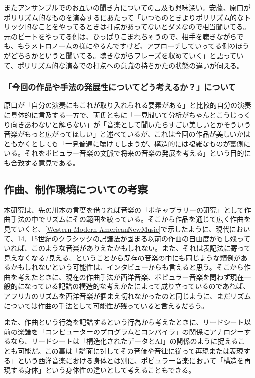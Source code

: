 \documentclass[uplatex,dvipdfmx]{ujarticle}
\begin{document}
またアンサンブルでのお互いの聞き方についての言及も興味深い。安藤、原口がポリリズム的なものを演奏するにあたって「いつものときよりポリリズム的なトリック的なことをやってるときは打点があってないとダメなので相当聞いてる。元のビートをやってる側は、ひっぱりこまれちゃうので、相手を聴きながらでも、もうメトロノームの様にやるんですけど、アプローチしていってる側のほうがどちらかというと聞いてる。聴きながらフレーズを収めていく」と語っていて、ポリリズム的な演奏での打点への意識の持ちかたの状態の違いが伺える。

\subsubsection{「今回の作品や手法の発展性についてどう考えるか？」について}

原口が「自分の演奏にもこれが取り入れられる要素がある」と比較的自分の演奏に具体的に言及する一方で、両氏ともに「一見聞いて分析がちゃんとこうじっくり向きあわないと解らない」が「音楽として聞いたらすごい美しいとかそういう音楽がもっと広がってほしい」と述べているが、これは今回の作品が美しいかはともかくとしても「一見普通に聴けてしまうが、構造的には複雑なものが裏側にいる。それをポピュラー音楽の文脈で将来の音楽の発展を考える」という目的にも合致する意見である。

\subsection{作曲、制作環境についての考察}

本研究は、先の川本の言葉を借りれば音楽の「ボキャブラリーの研究」として作曲手法の中でリズムにその範囲を絞っている。そこから作品を通じて広く作曲を見ていくと、\ref{Western-Modern-AmericanNewMusic}で示したように、現代において、14、15世紀のクラシックの記譜法が固まる以前の作曲の自由度がもし残っていれば、このような音楽がありえたかもしれない。また、それは表記法に寄って見えなくなる/見える、ということから既存の音楽の中にも同じような類例があるかもしれないという可能性は、インタビューからも言えると思う。そこから作曲を考えたときに、現在の作曲手法が西洋音楽、ポピュラー音楽を問わず現在一般的になっている記譜の構造的な考えかたによって成り立っているのであれば、アフリカのリズムを西洋音楽が掴まえ切れなかったのと同じように、まだリズムについては作曲の手法として可能性が残っていると言えるだろう。

また、作曲という行為を記譜するという行為から考えたときに、リードシート以前の楽譜を「コンピューターのプログラムとコンパイラ」の関係にアナロジーするなら、リードシートは「構造化されたデータとAI」の関係のように捉えることも可能だ。この事は「譜面に対してその音価や音律に従って再現または表現する」という西洋音楽における身体とは別に、ポピュラー音楽において「構造を再現する身体」という身体性の違いとして考えることもできる。
\end{document}
